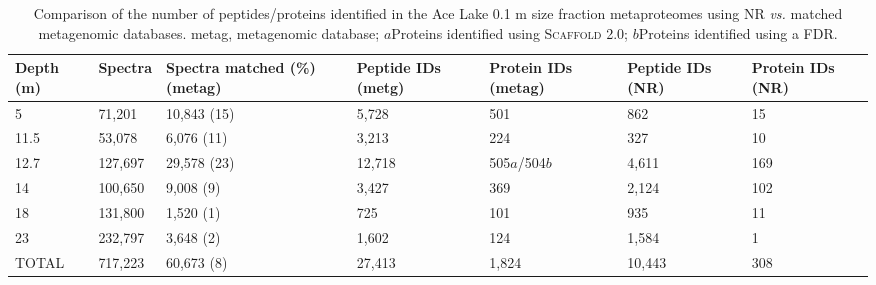 \begin{table}
\footnotesize
\caption[Comparison of peptides/proteins identified with \acs{NR} \emph{vs.} matched metagenomes]{Comparison of the number of peptides/proteins identified in the Ace Lake 0.1 \textmu{}m size fraction metaproteomes using \acs{NR} \emph{vs.} matched metagenomic databases. metag, metagenomic database; $a$Proteins identified using \textsc{Scaffold} 2.0; $b$Proteins identified using a \acs{FDR}.}
\label{tab:protid_stats}
\smallskip
\begin{tabularx}{\textwidth}{XXXXXXX}
\toprule
\textbf{Depth (m)} & \textbf{Spectra} & \textbf{Spectra matched (\%) (metag)} &\textbf{Peptide IDs (metg)} & \textbf{Protein IDs (metag)} & \textbf{Peptide IDs (\acs{NR})} & \textbf{Protein IDs (\acs{NR})} \\
\midrule
5     & 71,201  & 10,843 (15) & 5,728  & 501     & 862    & 15 \\
11.5  & 53,078  & 6,076 (11)  & 3,213  & 224     & 327    & 10 \\
12.7  & 127,697 & 29,578 (23) & 12,718 & 505$a$/504$b$ & 4,611  & 169 \\
14    & 100,650 & 9,008 (9)   & 3,427  & 369     & 2,124  & 102 \\
18    & 131,800 & 1,520 (1)   & 725    & 101     & 935    & 11 \\
23    & 232,797 & 3,648 (2)   & 1,602  & 124     & 1,584  & 1 \\
TOTAL & 717,223 & 60,673 (8)  & 27,413 & 1,824   & 10,443 & 308 \\
\bottomrule
\end{tabularx}
\end{table}
